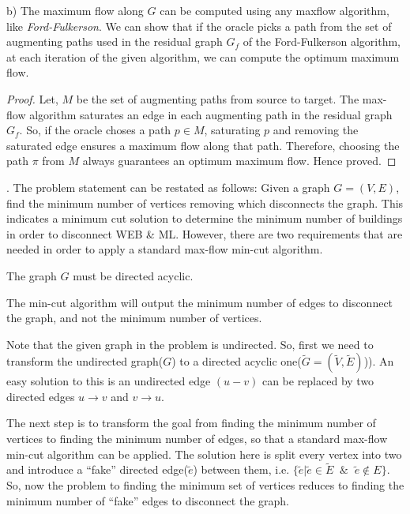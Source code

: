 \documentclass[assign]{article}
\begin{document}
\vspace{-5pt}
\par \noindent b) The maximum flow along $G$ can be computed using any maxflow algorithm, like {\em Ford-Fulkerson}. We can show that if the oracle picks a path from the set of augmenting paths used in the residual graph $G_f$ of the Ford-Fulkerson algorithm, at each iteration of the given algorithm, we can compute the optimum maximum flow.

\begin{proof}
     Let, $M$ be the set of augmenting paths from source to target.  The max-flow algorithm saturates an edge in each augmenting path in the residual graph $G_f$. So, if the oracle choses a path $p \in M$, saturating  $p$  and removing the saturated edge ensures a maximum flow along that path. Therefore, choosing the path $\pi$ from $M$ always guarantees an optimum maximum flow. Hence proved.
\end{proof}

. The problem statement can be restated as follows: Given a graph $G=(V,E)$, find the minimum number of vertices removing which disconnects the graph. This indicates a minimum cut solution to determine the minimum number of buildings in order to disconnect WEB \& ML. However, there are two requirements that are needed in order to apply a standard max-flow min-cut algorithm. 
\begin{compactenum}
  \item The graph $G$ must be directed acyclic.
  \item The min-cut algorithm will output the minimum number of edges to disconnect the graph, and not the minimum number of vertices.
\end{compactenum}

\noindent Note that the given graph in the problem is undirected. So, first we need to transform the undirected graph($G$) to a directed acyclic one($\tilde{G}=(\tilde{V},\tilde{E})$)). An easy solution to this is an undirected edge $(u - v)$ can be replaced by two directed edges $u \rightarrow v$ and $v \rightarrow u$.
\par\noindent The next step is to transform the goal from finding the minimum number of vertices to finding the minimum number of edges, so that a standard max-flow min-cut algorithm can be applied.  The solution here is split every vertex into two and introduce a ``fake'' directed edge($\tilde{e}$) between them, i.e. $\{\tilde{e} | \tilde{e} \in \tilde{E} \; \; \& \; \; \tilde{e} \notin E\}$. So, now the problem to finding the minimum set of vertices reduces to finding the minimum number of ``fake'' edges to disconnect the graph.
\end{document}
